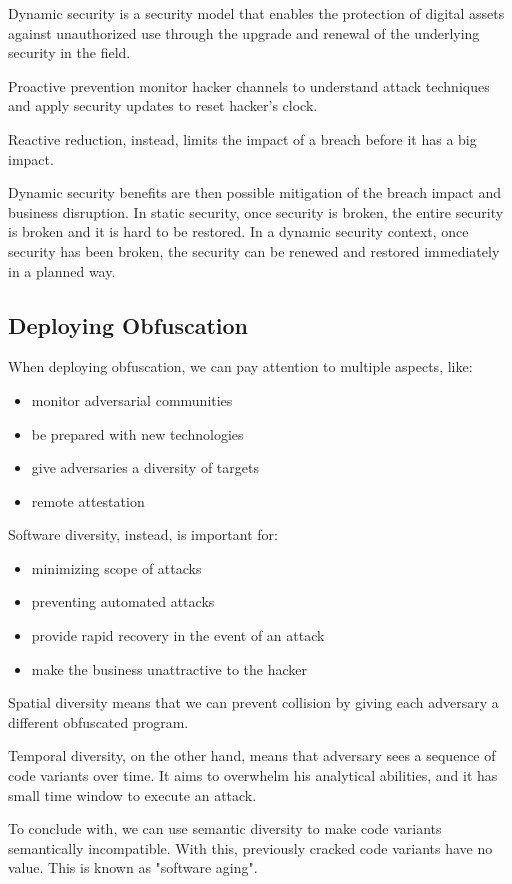 Dynamic security is a security model that enables the protection of digital assets against unauthorized use through the upgrade and renewal of the underlying security in the field. 
\par
Proactive prevention monitor hacker channels to understand attack techniques and apply security updates to reset hacker's clock. 
\par 
Reactive reduction, instead, limits the impact of a breach before it has a big impact. 

Dynamic security benefits are then possible mitigation of the breach impact and business disruption. In static security, once security is broken, the entire security is broken and it is hard to be restored. 
In a dynamic security context, once security has been broken, the security can be renewed and restored immediately in a planned way. 

\subsection{Deploying Obfuscation}
When deploying obfuscation, we can pay attention to multiple aspects, like:
\begin{itemize}
    \item monitor adversarial communities 
    \item be prepared with new technologies
    \item give adversaries a diversity of targets 
    \item remote attestation 
\end{itemize}

Software diversity, instead, is important for: 
\begin{itemize}
    \item minimizing scope of attacks 
    \item preventing automated attacks
    \item provide rapid recovery in the event of an attack
    \item make the business unattractive to the hacker
\end{itemize}

Spatial diversity means that we can prevent collision by giving each adversary a different obfuscated program.
\par
Temporal diversity, on the other hand, means that adversary sees a sequence of code variants over time. It aims to overwhelm his analytical abilities, and it has small time window to execute an attack. 
\par 
To conclude with, we can use semantic diversity to make code variants semantically incompatible. With this, previously cracked code variants have no value. This is known as "software aging". 
